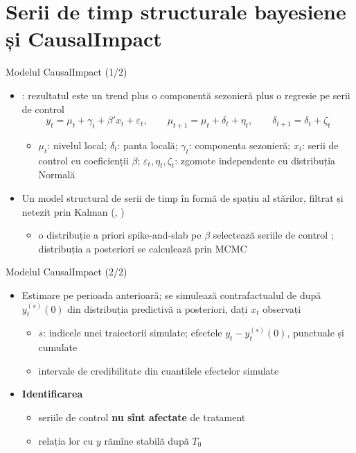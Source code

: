 \section{Serii de timp structurale bayesiene și CausalImpact}

\begin{frame}{Modelul CausalImpact (1/2)}
\itemsize{\small}
\begin{itemize}
    \item {}: rezultatul este un trend plus o componentă sezonieră plus o regresie pe serii de control \[ y_t = \mu_t + \gamma_t + \beta'x_t + \varepsilon_t, \qquad \mu_{t+1} = \mu_t + \delta_t + \eta_t, \qquad \delta_{t+1} = \delta_t + \zeta_t \]
    \begin{itemize}
        \item $\mu_t$: nivelul local; $\delta_t$: panta locală; $\gamma_t$: componenta sezonieră; $x_t$: serii de control cu coeficienții $\beta$; $\varepsilon_t, \eta_t, \zeta_t$: zgomote independente cu distribuția Normală
    \end{itemize}
    \item Un model structural de serii de timp  în formă de spațiu al stărilor, filtrat și netezit prin Kalman (, )
    \begin{itemize}
        \item o distribuție a priori spike-and-slab pe $\beta$ selectează seriile de control ; distribuția a posteriori se calculează prin MCMC
    \end{itemize}
\end{itemize}
\end{frame}

\begin{frame}{Modelul CausalImpact (2/2)}
\itemsize{\small}
\begin{itemize}
    \item Estimare pe perioada anterioară; se simulează contrafactualul de după $y^{(s)}_t(0)$ din distribuția predictivă a posteriori, dați $x_t$ observați
    \begin{itemize}
        \item $s$: indicele unei traiectorii simulate; efectele $y_t - y^{(s)}_t(0)$, punctuale și cumulate
        \item intervale de credibilitate din cuantilele efectelor simulate
    \end{itemize}
    \item \textbf{Identificarea}
    \begin{itemize}
        \item seriile de control \textbf{nu sînt afectate} de tratament
        \item relația lor cu $y$ rămîne stabilă după $T_0$
    \end{itemize}
\end{itemize}
\end{frame}

